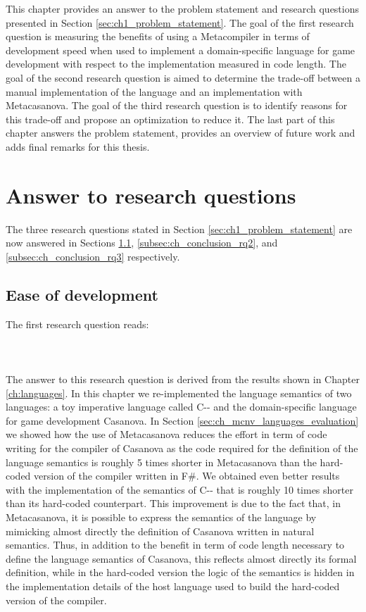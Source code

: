 This chapter provides an answer to the problem statement and research questions presented in Section \ref{sec:ch1_problem_statement}. The goal of the first research question is measuring the benefits of using a Metacompiler in terms of development speed when used to implement a domain-specific language for game development with respect to the implementation measured in code length. The goal of the second research question is aimed to determine the trade-off between a manual implementation of the language and an implementation with Metacasanova. The goal of the third research question is to identify reasons for this trade-off and propose an optimization to reduce it. The last part of this chapter answers the problem statement, provides an overview of future work and adds final remarks for this thesis.

\section{Answer to research questions}
\label{sec:ch_conclusion_answer_research_questions}
The three research questions stated in Section \ref{sec:ch1_problem_statement} are now answered  in Sections \ref{subsec:ch_conclusion_rq1}, \ref{subsec:ch_conclusion_rq2}, and \ref{subsec:ch_conclusion_rq3} respectively.

\subsection{Ease of development}
\label{subsec:ch_conclusion_rq1}

The first research question reads:\\\\
\\\\

The answer to this research question is derived from the results shown in Chapter \ref{ch:languages}. In this chapter we re-implemented the language semantics of two languages: a toy imperative language called C-{}- and the domain-specific language for game development Casanova. In Section \ref{sec:ch_mcnv_languages_evaluation} we showed how the use of Metacasanova reduces the effort in term of code writing for the compiler of Casanova as the code required for the definition of the language semantics is roughly 5 times shorter in Metacasanova than the hard-coded version of the compiler written in F\#. We obtained even better results with the implementation of the semantics of C-{}- that is roughly 10 times shorter than its hard-coded counterpart. This improvement is due to the fact that, in Metacasanova, it is possible to express the semantics of the language by mimicking almost directly the definition of Casanova written in natural semantics. Thus, in addition to the benefit in term of code length necessary to define the language semantics of Casanova, this reflects almost directly its formal definition, while in the hard-coded version the logic of the semantics is hidden in the implementation details of the host language used to build the hard-coded version of the compiler.

